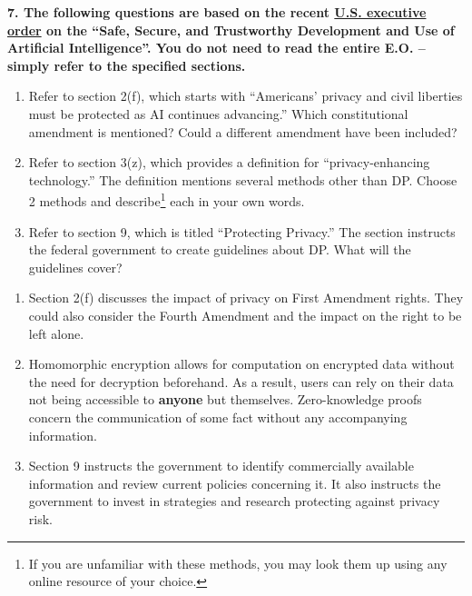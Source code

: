 \documentclass{article}
\begin{document}
\textbf{7. The following questions are based on the recent \href{https://www.whitehouse.gov/briefing-room/presidential-actions/2023/10/30/executive-order-on-the-safe-secure-and-trustworthy-development-and-use-of-artificial-intelligence/} {U.S. executive order} on the ``Safe, Secure, and Trustworthy Development and Use of Artificial Intelligence''. You do not need to read the entire E.O. -- simply refer to the specified sections.}
\begin{enumerate}[label=\Alph*.]
    \item Refer to section 2(f), which starts with ``Americans’ privacy and civil liberties must be protected as AI continues advancing.'' Which constitutional amendment is mentioned? Could a different amendment have been included?
    \item Refer to section 3(z), which provides a definition for ``privacy-enhancing technology.'' The definition mentions several methods other than DP. Choose 2 methods and describe\footnote{If you are unfamiliar with these methods, you may look them up using any online resource of your choice.} each in your own words.
    \item Refer to section 9, which is titled ``Protecting Privacy.'' The section instructs the federal government to create guidelines about DP. What will the guidelines cover?
\end{enumerate}

\bigskip
\begin{mdframed}
\begin{enumerate}[label=\Alph*.]
    \item Section 2(f) discusses the impact of privacy on First Amendment rights. They could also consider the Fourth Amendment and the impact on the right to be left alone.
    \item Homomorphic encryption allows for computation on encrypted data without the need for decryption beforehand. As a result, users can rely on their data not being accessible to \textbf{anyone} but themselves. Zero-knowledge proofs concern the communication of some fact without any accompanying information.
    \item Section 9 instructs the government to identify commercially available information and review current policies concerning it. It also instructs the government to invest in strategies and research protecting against privacy risk.
\end{enumerate}
\end{mdframed}
\bigskip
\end{document}
